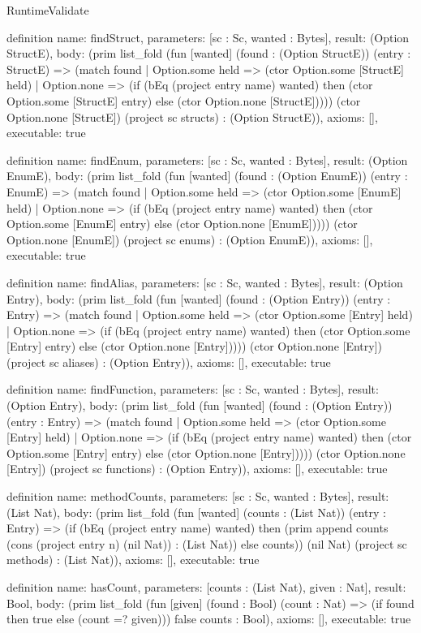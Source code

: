 \begin{lexlean}{RuntimeValidate}
\begin{semanticmodule}
definition{
  name: findStruct,
  parameters: [sc : Sc, wanted : Bytes],
  result: (Option StructE),
  body: (prim list_fold (fun [wanted] (found : (Option StructE)) (entry : StructE) => (match found
    | Option.some held => (ctor Option.some [StructE] held)
    | Option.none => (if (bEq (project entry name) wanted) then (ctor Option.some [StructE] entry) else (ctor Option.none [StructE])))) (ctor Option.none [StructE]) (project sc structs) : (Option StructE)),
  axioms: [],
  executable: true
}

definition{
  name: findEnum,
  parameters: [sc : Sc, wanted : Bytes],
  result: (Option EnumE),
  body: (prim list_fold (fun [wanted] (found : (Option EnumE)) (entry : EnumE) => (match found
    | Option.some held => (ctor Option.some [EnumE] held)
    | Option.none => (if (bEq (project entry name) wanted) then (ctor Option.some [EnumE] entry) else (ctor Option.none [EnumE])))) (ctor Option.none [EnumE]) (project sc enums) : (Option EnumE)),
  axioms: [],
  executable: true
}

definition{
  name: findAlias,
  parameters: [sc : Sc, wanted : Bytes],
  result: (Option Entry),
  body: (prim list_fold (fun [wanted] (found : (Option Entry)) (entry : Entry) => (match found
    | Option.some held => (ctor Option.some [Entry] held)
    | Option.none => (if (bEq (project entry name) wanted) then (ctor Option.some [Entry] entry) else (ctor Option.none [Entry])))) (ctor Option.none [Entry]) (project sc aliases) : (Option Entry)),
  axioms: [],
  executable: true
}

definition{
  name: findFunction,
  parameters: [sc : Sc, wanted : Bytes],
  result: (Option Entry),
  body: (prim list_fold (fun [wanted] (found : (Option Entry)) (entry : Entry) => (match found
    | Option.some held => (ctor Option.some [Entry] held)
    | Option.none => (if (bEq (project entry name) wanted) then (ctor Option.some [Entry] entry) else (ctor Option.none [Entry])))) (ctor Option.none [Entry]) (project sc functions) : (Option Entry)),
  axioms: [],
  executable: true
}

definition{
  name: methodCounts,
  parameters: [sc : Sc, wanted : Bytes],
  result: (List Nat),
  body: (prim list_fold (fun [wanted] (counts : (List Nat)) (entry : Entry) => (if (bEq (project entry name) wanted) then (prim append counts (cons (project entry n) (nil Nat)) : (List Nat)) else counts)) (nil Nat) (project sc methods) : (List Nat)),
  axioms: [],
  executable: true
}

definition{
  name: hasCount,
  parameters: [counts : (List Nat), given : Nat],
  result: Bool,
  body: (prim list_fold (fun [given] (found : Bool) (count : Nat) => (if found then true else (count =? given))) false counts : Bool),
  axioms: [],
  executable: true
}


\end{semanticmodule}
\end{lexlean}
